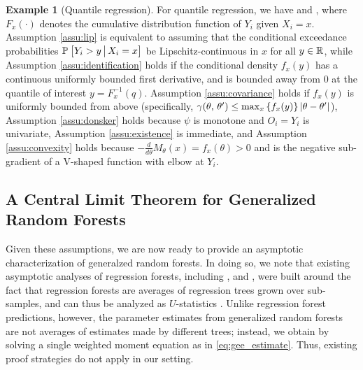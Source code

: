 \documentclass[aos]{imsart}
\theoremstyle{plain}
\theoremstyle{definition}
\newtheorem{exam}{Example}
\theoremstyle{remark}
\begin{document}
\begin{CJK}{UTF8}{gbsn}
\begin{exam}[Quantile regression]
For quantile regression, we have
and ,
where $F_x(\cdot)$ denotes the cumulative distribution function of $Y_i$ given $X_i = x$.
Assumption \ref{assu:lip} is equivalent to assuming that the
conditional exceedance probabilities $\mathbb{P}_{}\left[Y_i > y \,\big|\, X_i = x\right]$
be Lipschitz-continuous in $x$ for all $y \in \mathbb{R}$, while Assumption \ref{assu:identification}
holds if the conditional density $f_x(y)$ has a continuous uniformly bounded first derivative,
and is bounded away from 0 at the quantile of interest $y = F^{-1}_x(q)$.
Assumption \ref{assu:covariance} holds if $f_x(y)$ is uniformly bounded from above
(specifically, $\gamma(\theta, \, \theta') \leq \max_x \left\{f_x(y)\right\} \left\lvert\theta - \theta'\right\rvert$),
Assumption \ref{assu:donsker} holds because $\psi$ is monotone and $O_i = Y_i$ is univariate,
Assumption \ref{assu:existence} is immediate, and Assumption \ref{assu:convexity} holds
because $ - \frac{d}{d\theta} M_\theta(x) = f_x(\theta) > 0$ and 
is the negative sub-gradient of a V-shaped function with elbow at $Y_i$.
\end{exam}

\subsection{A Central Limit Theorem for Generalized Random Forests}
\label{sec:gauss}

Given these assumptions, we are now ready to provide an asymptotic characterization
of generalzed random forests. In doing so, we note that existing asymptotic analyses of regression forests,
including \citet{mentch2016quantifying}, \citet{scornet2015consistency} and \citet{wager2015estimation},
were built around the fact that regression forests are averages of regression
trees grown over sub-samples, and can thus be analyzed as $U$-statistics \citep{hoeffding1948class}.
Unlike regression forest predictions, however, the parameter estimates 
from generalized random forests are not averages of estimates made by different trees;
instead, we obtain  by solving a single weighted moment equation
as in \eqref{eq:gee_estimate}. Thus, existing proof strategies do not apply in our setting.


\end{CJK}
\end{document}

